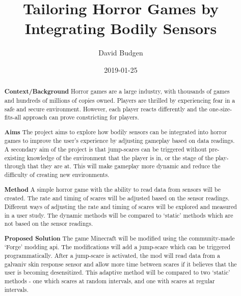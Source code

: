 \documentclass[12pt,a4paper]{article}
\title{Tailoring Horror Games by Integrating Bodily Sensors}
\author{David Budgen}
\date{2019-01-25}
\begin{document}
\maketitle

\begin{abstract}


\textbf{Context/Background}
Horror games are a large industry, with thousands of games and hundreds of millions of copies owned. Players are thrilled by experiencing fear in a safe and secure environment. However, each player reacts differently and the one-size-fits-all approach can prove constricting for players.

\textbf{Aims}
The project aims to explore how bodily sensors can be integrated into horror games to improve the user's experience by adjusting gameplay based on data readings. A secondary aim of the project is that jump-scares can be triggered without pre-existing knowledge of the environment that the player is in, or the stage of the play-through that they are at. This will make gameplay more dynamic and reduce the difficulty of creating new environments.

\textbf{Method}
A simple horror game with the ability to read data from sensors will be created. The rate and timing of scares will be adjusted based on the sensor readings. Different ways of adjusting the rate and timing of scares will be explored and measured in a user study. The dynamic methods will be compared to `static' methods which are not based on the sensor readings.

\textbf{Proposed Solution}
The game Minecraft will be modified using the community-made `Forge' modding api. The modifications will add a jump-scare which can be triggered programmatically. After a jump-scare is activated, the mod will read data from a galvaniv skin response sensor and allow more time between scares if it believes that the user is becoming desensitized. This adaptive method will be compared to two `static' methods - one which scares at random intervals, and one with scares at regular intervals.
\end{abstract}
\end{document}
